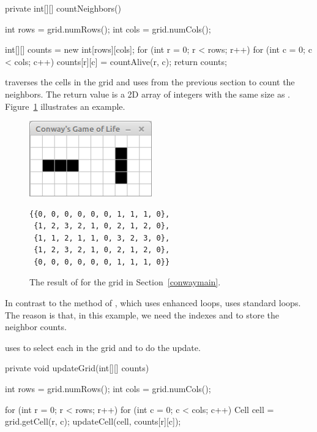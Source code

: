 \begin{code}
private int[][] countNeighbors() {
    int rows = grid.numRows();
    int cols = grid.numCols();

    int[][] counts = new int[rows][cols];
    for (int r = 0; r < rows; r++) {
        for (int c = 0; c < cols; c++) {
            counts[r][c] = countAlive(r, c);
        }
    }
    return counts;
}
\end{code}

 traverses the cells in the grid and uses  from the previous section to count the neighbors.
The return value is a 2D array of integers with the same size as .
Figure~\ref{fig:countNeigh} illustrates an example.

\begin{figure}[!ht]
\begin{center}
\begin{minipage}{160pt}
\includegraphics[trim=0 0 0 23pt,clip,width=150pt]{figs/conway.png}
\end{minipage}
\begin{minipage}{200pt}
\begin{verbatim}
{{0, 0, 0, 0, 0, 0, 1, 1, 1, 0},
 {1, 2, 3, 2, 1, 0, 2, 1, 2, 0},
 {1, 1, 2, 1, 1, 0, 3, 2, 3, 0},
 {1, 2, 3, 2, 1, 0, 2, 1, 2, 0},
 {0, 0, 0, 0, 0, 0, 1, 1, 1, 0}}
\end{verbatim}
\end{minipage}
\caption{The result of  for the grid in Section~\ref{conwaymain}.}
\label{fig:countNeigh}
\end{center}
\end{figure}

In contrast to the  method of , which uses enhanced  loops,  uses standard  loops.
The reason is that, in this example, we need the indexes  and  to store the neighbor counts.

 uses  to select each  in the grid and  to do the update.

\begin{code}
private void updateGrid(int[][] counts) {
    int rows = grid.numRows();
    int cols = grid.numCols();

    for (int r = 0; r < rows; r++) {
        for (int c = 0; c < cols; c++) {
            Cell cell = grid.getCell(r, c);
            updateCell(cell, counts[r][c]);
        }
    }
}
\end{code}


